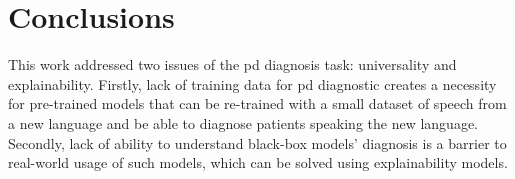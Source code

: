 
\chapter{Conclusions}
\label{ch:magna}


This work addressed two issues of the \gls{pd} diagnosis task: universality and explainability. Firstly, lack of training data for \gls{pd} diagnostic creates a necessity for pre-trained models that can be re-trained with a small dataset of speech from a new language and be able to diagnose patients speaking the new language. Secondly, lack of ability to understand black-box models' diagnosis is a barrier to real-world usage of such models, which can be solved using explainability models. \\
